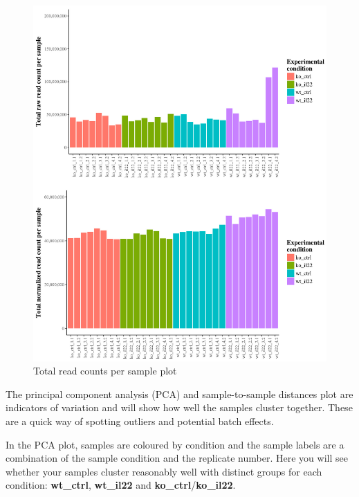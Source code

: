 \documentclass[11pt]{article}
\makeatletter
\def\maxwidth{\ifdim\Gin@nat@width>\linewidth\linewidth
    \else\Gin@nat@width\fi}
\let\Oldincludegraphics\includegraphics
\renewcommand{\includegraphics}[1]{\Oldincludegraphics[width=.8\maxwidth, height=.55\textheight, keepaspectratio]{#1}}
\makeatother
\begin{document}
    \begin{figure}[H]
\centering
\includegraphics{images/reads_per_sample.png}
\caption{Total read counts per sample plot}
\end{figure}

    The principal component analysis (PCA) and sample-to-sample distances
plot are indicators of variation and will show how well the samples
cluster together. These are a quick way of spotting outliers and
potential batch effects.

In the PCA plot, samples are coloured by condition and the sample labels
are a combination of the sample condition and the replicate number. Here
you will see whether your samples cluster reasonably well with distinct
groups for each condition: \textbf{wt\_ctrl}, \textbf{wt\_il22} and
\textbf{ko\_ctrl}/\textbf{ko\_il22}.
\end{document}
